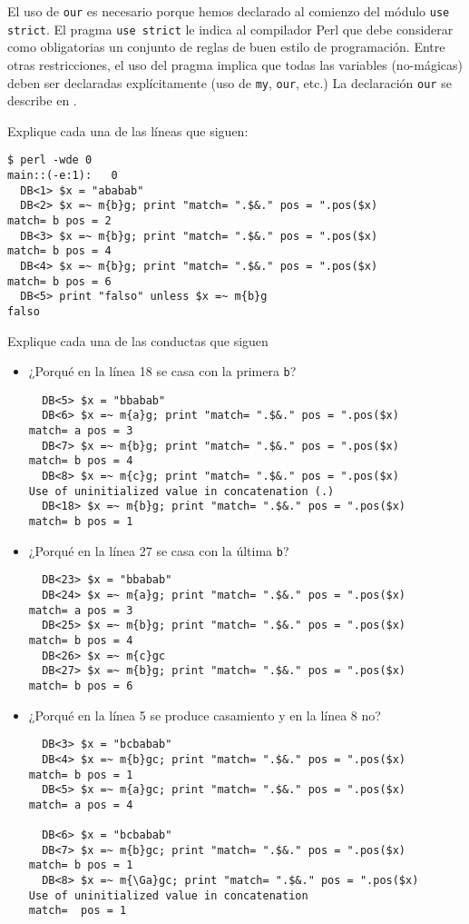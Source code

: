 El uso de \verb|our| es necesario porque hemos 
declarado al comienzo del módulo \verb|use strict|.
El pragma {\tt use strict} le indica al compilador Perl 
que debe considerar como obligatorias un conjunto de reglas de
buen estilo de programación. Entre otras restricciones, el uso del
pragma implica que
todas las variables (no-mágicas) 
deben ser declaradas explícitamente (uso de \verb|my|, \verb|our|, etc.)
La declaración \verb|our| se describe en .


Explique cada una de las líneas que siguen:
\begin{verbatim}
$ perl -wde 0
main::(-e:1):   0
  DB<1> $x = "ababab"
  DB<2> $x =~ m{b}g; print "match= ".$&." pos = ".pos($x)
match= b pos = 2
  DB<3> $x =~ m{b}g; print "match= ".$&." pos = ".pos($x)
match= b pos = 4
  DB<4> $x =~ m{b}g; print "match= ".$&." pos = ".pos($x)
match= b pos = 6
  DB<5> print "falso" unless $x =~ m{b}g
falso
\end{verbatim}


Explique cada una de las conductas que siguen
\begin{itemize}
\item
¿Porqué en la línea 18 se casa con la primera \verb|b|?
\begin{verbatim}
  DB<5> $x = "bbabab"
  DB<6> $x =~ m{a}g; print "match= ".$&." pos = ".pos($x)
match= a pos = 3
  DB<7> $x =~ m{b}g; print "match= ".$&." pos = ".pos($x)
match= b pos = 4
  DB<8> $x =~ m{c}g; print "match= ".$&." pos = ".pos($x)
Use of uninitialized value in concatenation (.) 
  DB<18> $x =~ m{b}g; print "match= ".$&." pos = ".pos($x)
match= b pos = 1
\end{verbatim}

\item
¿Porqué en la línea 27 se casa con la última \verb|b|?
\begin{verbatim}
  DB<23> $x = "bbabab"
  DB<24> $x =~ m{a}g; print "match= ".$&." pos = ".pos($x)
match= a pos = 3
  DB<25> $x =~ m{b}g; print "match= ".$&." pos = ".pos($x)
match= b pos = 4
  DB<26> $x =~ m{c}gc
  DB<27> $x =~ m{b}g; print "match= ".$&." pos = ".pos($x)
match= b pos = 6
\end{verbatim}

\item
¿Porqué en la línea 5 se produce casamiento y en la línea 8 no?
\begin{verbatim}
  DB<3> $x = "bcbabab"
  DB<4> $x =~ m{b}gc; print "match= ".$&." pos = ".pos($x)
match= b pos = 1
  DB<5> $x =~ m{a}gc; print "match= ".$&." pos = ".pos($x)
match= a pos = 4

  DB<6> $x = "bcbabab"
  DB<7> $x =~ m{b}gc; print "match= ".$&." pos = ".pos($x)
match= b pos = 1
  DB<8> $x =~ m{\Ga}gc; print "match= ".$&." pos = ".pos($x)
Use of uninitialized value in concatenation 
match=  pos = 1
\end{verbatim}
\end{itemize}

